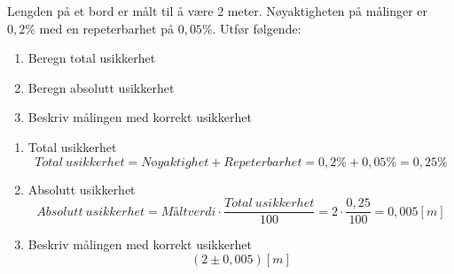 \begin{comment}

	\begin{question}[name=Oppgave, topic=måleusikkerhet]

		\begin{enumerate}[label=\roman*)]

		\end{enumerate}
	\end{question}

	\vspace{0.5cm} %

	\begin{solution}[name=Løsningsforslag oppgave]

		\begin{figure}[H]
			\centering
			\texttt{[image: ]}
			\caption{}
			\label{fig:}
		\end{figure}
	\end{solution}

	\vspace{0.5cm} %
\end{comment}



\begin{question}[name=Oppgave, topic=måleusikkerhet]
Lengden på et bord er målt til å være 2 meter. Nøyaktigheten på målinger er $0,2\%$ med en repeterbarhet på $0,05 \%$. Utfør følgende:

	\begin{enumerate}[label=\roman*)]
		\item Beregn total usikkerhet
		\item Beregn absolutt usikkerhet
		\item Beskriv målingen med korrekt usikkerhet
	\end{enumerate}


\end{question}

\vspace{0.5cm} %

\begin{solution}[name=Løsningsforslag oppgave]
	\begin{enumerate}[label=\roman*)]
	\item Total usikkerhet
\[Total\ usikkerhet = Nøyaktighet + Repeterbarhet = 0,2 \% + 0,05 \% = 0,25 \% \]
	\item Absolutt usikkerhet
\[Absolutt\ usikkerhet = M\text{å}lt verdi \cdot \frac{Total\ usikkerhet}{100}=2 \cdot \frac{0,25}{100}=0,005[m]\]
	\item Beskriv målingen med korrekt usikkerhet
\[(2 \pm 0,005) [m]\]
	\end{enumerate}
\end{solution}

